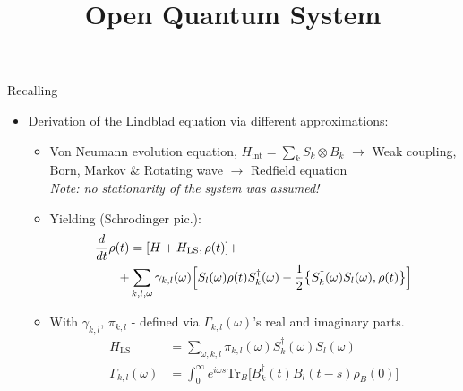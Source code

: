\documentclass[10pt,xcolor={table,dvipsnames},t]{beamer}
\title{Open Quantum System}
\subtitle{
  Lectures: \\ 
  \footnotesize
  \begin{itemize}
      \setlength\itemsep{-0.5em}
    { 
      \transparent{0.4}
    \item[] Last time:
    \item Daniel Manzano, A short introduction to the Lindblad master equation (\textit{all})
    \item Breuer and Petruccione, The Theory of Open Quantum Systems (\textit{ch. 3 - 4.3})
    \item Daniel A. Lidar, Notes on the Theory of Open Quantum Systems (\textit{up to ch. 12})
    }
  \item[] Today:
    \item Breuer and Petruccione, The Theory of Open Quantum Systems (\textit{ch. 3 - 4.3})
    \item Daniel A. Lidar, Notes on the Theory of Open Quantum Systems (\textit{up to ch. 12})
    \item B.Kraus, H.P.Buchler, S. Diehl, A. Kantian, A. Micheli, \& P. Zoller, Preparation of Entangled States by Quantum Markov Processes
    \item Buča, B., Tindall, J. \& Jaksch, D. Non-stationary coherent quantum many-body dynamics through dissipation
    \item Victor V. Albert \& Liang Jiang, Symmetries and conserved quantities in Lindblad master equations
    \item Cameron Booker, Berislav Buča, Dieter Jaksch, Non-stationarity and Dissipative Time Crystals: Spectral Properties and Finite-Size Effects
  \end{itemize}
  \vspace{-1cm}
}
\newcommand{\dt}{\frac{d}{dt}}
\newcommand{\Hint}{H_{\text{int}}}
\newcommand{\tr}[2]{\text{Tr}_{#1}\bigl[#2\bigr]}
\begin{document}
\begin{frame}
  \titlepage
\end{frame}


\begin{frame}{Recalling}
\begin{itemize}
    \item Derivation of the Lindblad equation via different approximations:
      \begin{itemize}
        \item Von Neumann evolution equation, $\Hint=\sum_k S_k \otimes B_k$ $\rightarrow$ Weak coupling, Born, Markov \& Rotating wave $\rightarrow$ Redfield equation\\
          \textit{Note: no stationarity of the system was assumed!}
        \item Yielding (Schrodinger pic.): 
        \begin{equation}
          \begin{split}
            \dt \rho(t) &= [H+H_\text{LS}, \rho(t)] + \\
                        +&\sum_{k,l, \omega} \gamma_{k,l}(\omega) \Bigl[S_l(\omega)\rho(t)S_k^\dag(\omega) - \frac{1}{2}\bigl\{ S_k^\dag(\omega) S_l(\omega), \rho(t) \bigr\}\Bigr]
          \end{split}
        \end{equation}
      \item With $\gamma_{k,l}$, $\pi_{k,l}$ - defined via $\Gamma_{k,l}(\omega)$'s real and imaginary parts.
          \begin{equation}
            \begin{split}
              H_\text{LS} &= \sum_{\omega, k,l}\pi_{k,l}(\omega)S_k^\dag (\omega) S_l(\omega)\\
              \Gamma_{k,l}(\omega) &= \int_0^\infty e^{i\omega s} \tr{B}{B_k^\dag(t) B_l(t-s) \rho_B(0)}
            \end{split}
          \end{equation}
      \end{itemize}
\end{itemize}
\end{frame}
\end{document}
